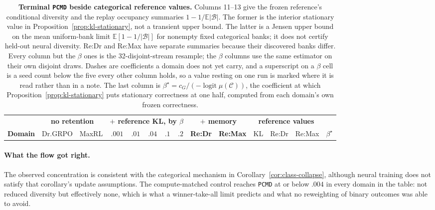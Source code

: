 \documentclass{article}
\newcommand{\1}{\mathbf 1}
\newcommand{\E}{\mathbb E}
\newcommand{\pmd}{\texttt{PCMD}}
\theoremstyle{remark}
\theoremstyle{definition}
\theoremstyle{plain}
\begin{document}
\begin{table}[t]
  \centering
  \caption{\textbf{Terminal \pmd{} beside categorical reference values.}
  Columns 11--13 give the frozen reference's conditional diversity and
  the replay occupancy summaries $1-1/\E|\mathcal B|$.
  The former is the interior stationary value in
  Proposition~\ref{prop:kl-stationary}, not a transient upper bound.
  The latter is a Jensen upper bound on the mean uniform-bank limit
  $\E[1-1/|\mathcal B|]$ for nonempty fixed categorical banks; it does not
  certify held-out neural diversity. Re:Dr and Re:Max have separate summaries
  because their discovered banks differ. Every
  column but the $\beta$ ones is the 32-disjoint-stream resample; the $\beta$
  columns use the same estimator on their own disjoint draws. Dashes are
  coefficients a domain does not yet carry, and a superscript on a $\beta$ cell
  is a seed count below the five every other column holds, so a value resting
  on one run is marked where it is read rather than in a note. The last column
  is $\beta^\star=c_G/(-\operatorname{logit}\mu(\mathcal C))$, the coefficient
  at which Proposition~\ref{prop:kl-stationary} puts stationary correctness at
  one half, computed from each domain's own frozen correctness.}
  \label{tab:reference-kl-measured}
  \scriptsize
  \setlength{\tabcolsep}{2.9pt}
  \begin{tabular}{@{}lrrrrrrrrrrrrr@{}}
    \toprule
    & \multicolumn{2}{c}{\textbf{no retention}}
      & \multicolumn{5}{c}{\textbf{$+$ reference KL, by $\beta$}}
      & \multicolumn{2}{c}{\textbf{$+$ memory}}
      & \multicolumn{3}{c}{\textbf{reference values}} & \\
    \cmidrule(lr){2-3}\cmidrule(lr){4-8}\cmidrule(lr){9-10}\cmidrule(lr){11-13}
    \textbf{Domain} & Dr.GRPO & MaxRL
      & $.001$ & $.01$ & $.04$ & $.1$ & $.2$
      & \textbf{Re:Dr} & \textbf{Re:Max}
      & KL & Re:Dr & Re:Max & $\beta^\star$ \\
    \midrule
    
  \end{tabular}
\end{table}
\paragraph{What the flow got right.}
The observed concentration is consistent with the categorical mechanism
in Corollary~\ref{cor:class-collapse}, although neural training does not
satisfy that corollary's update assumptions. The
compute-matched control reaches \pmd{} at or below $.004$ in every domain in
the table: not reduced diversity but effectively none, which is what a
winner-take-all limit predicts and what no reweighting of binary outcomes was
able to avoid.
\end{document}
